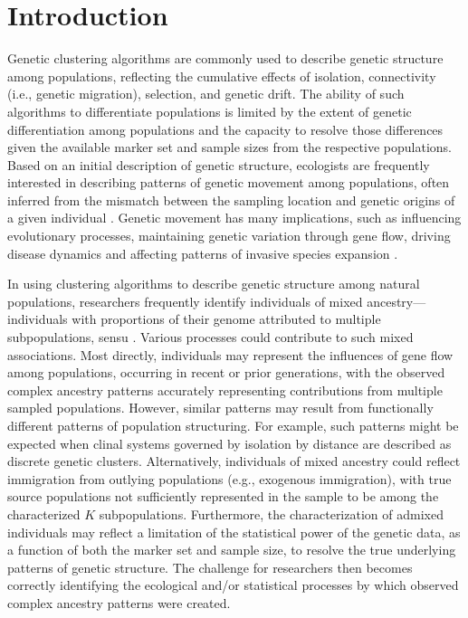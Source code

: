 
\section*{Introduction}

Genetic clustering algorithms are commonly used to describe genetic structure among populations, reflecting the cumulative
effects of isolation, connectivity (i.e., genetic migration), selection, and genetic drift.  The ability of such algorithms to differentiate populations
is limited by the extent of genetic differentiation among populations and the capacity to resolve those differences given the available marker
set and sample sizes from the respective populations.  Based on an initial description of genetic structure, ecologists are frequently
interested in describing patterns of genetic movement among populations, often inferred from the mismatch between the sampling location
and genetic origins of a given individual \citep{paetkau1995microsatellite,wilson2003bayesian}.  Genetic movement has many implications,
such as influencing evolutionary processes, maintaining genetic variation through gene flow, driving disease dynamics and affecting patterns 
of invasive species expansion \citep{huestis2019windborne, estoup2010reconstructing}.

In using clustering algorithms to describe genetic structure among natural populations, researchers frequently identify individuals of
mixed ancestry--- individuals with proportions of their genome attributed to multiple subpopulations, sensu \citet{pritchard2000inference}. 
Various processes could contribute to such mixed associations.  Most directly, individuals may represent the
influences of gene flow among populations, occurring in recent or prior generations, with the observed complex ancestry patterns accurately
representing contributions from multiple sampled populations.  However, similar patterns may result from functionally different patterns of
population structuring.  For example, such patterns might be expected when clinal systems governed by isolation by distance are described
as discrete genetic clusters.
Alternatively, individuals of mixed ancestry could reflect immigration from outlying populations (e.g., exogenous immigration), with true source
populations not sufficiently
represented in the sample to be among the characterized $K$ subpopulations.
Furthermore, the characterization of admixed individuals may reflect a limitation of the statistical power of the genetic data,
as a function of both the marker set and sample size, to resolve the true underlying patterns of genetic structure.
 The challenge for researchers then becomes correctly identifying the ecological and/or statistical processes by which observed complex
 ancestry patterns were created.

